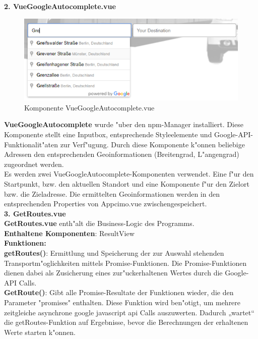 \documentclass[a4paper, 11pt]{scrreprt}
\begin{document}
\textbf{2. VueGoogleAutocomplete.vue}

\begin{figure} [H]
\begin{center}
\includegraphics[scale=1]{autocomplete.png}
\caption{Komponente VueGoogleAutocomplete.vue}
\label{Autocomplete}
\end{center}
\end{figure}

\textbf{VueGoogleAutocomplete} wurde "uber den npm-Manager installiert. Diese Komponente stellt eine Inputbox, entsprechende Styleelemente und Google-API-Funktionalit"aten zur Verf"ugung. Durch diese Komponente k"onnen beliebige Adressen den entsprechenden Geoinformationen (Breitengrad, L"angengrad) zugeordnet werden.\\

Es werden zwei VueGoogleAutocomplete-Komponenten verwendet. Eine f"ur den Startpunkt, bzw. den aktuellen Standort und eine Komponente f"ur den Zielort bzw. die Zieladresse. Die ermittelten Geoinformationen werden in den entsprechenden Properties von Appcimo.vue zwischengespeichert.\\


\textbf{3. GetRoutes.vue}\\

\textbf{GetRoutes.vue} enth"alt die Business-Logic des Programms. \\

\textbf{Enthaltene Komponenten}: ResultView\\

\textbf{Funktionen:}\\

\textbf{getRoutes()}: Ermittlung und Speicherung der zur Auswahl stehenden Transportm"oglichkeiten mittels Promise-Funktionen. Die Promise-Funktionen dienen dabei als Zusicherung eines zur"uckerhaltenen Wertes durch die Google-API Calls. \\

\textbf{GetRoute()}:  Gibt alle Promise-Resultate der Funktionen wieder, die den Parameter "promises" enthalten. Diese Funktion wird ben"otigt, um mehrere zeitgleiche asynchrone google javascript api Calls auszuwerten. Dadurch „wartet“ die getRoutes-Funktion auf Ergebnisse, bevor die Berechnungen der erhaltenen Werte starten k"onnen.\\
\end{document}
